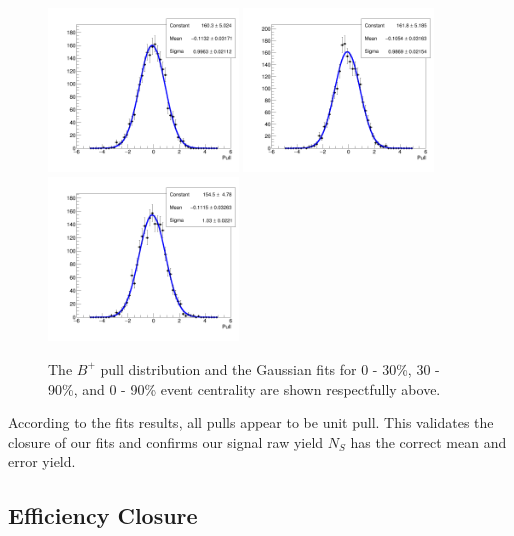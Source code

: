 \begin{figure}[h]
\begin{center}
\includegraphics[width= 0.45\textwidth]{Figures/Chapter5/BP_pull_signal_full_-1_0_90.png}
\includegraphics[width= 0.45\textwidth]{Figures/Chapter5/BP_pull_signal_full_-1_0_30.png}
\includegraphics[width= 0.45\textwidth]{Figures/Chapter5/BP_pull_signal_full_-1_30_90.png}
\caption{The $B^+$ pull distribution and the Gaussian fits for 0 - 30\%, 30 - 90\%, and 0 - 90\% event centrality are shown respectfully above.} 
\label{BPCentPull} 
\end{center}
\end{figure}




According to the fits results, all pulls appear to be unit pull. This validates the closure of our fits and confirms our signal raw yield $N_S$ has the correct mean and error yield.  

\subsection{Efficiency Closure}

